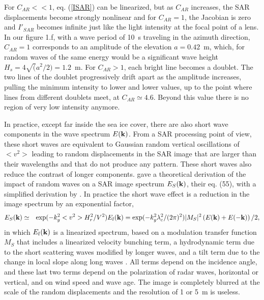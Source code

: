  For $C_{AR} << 1$, eq. (\ref{ISAR}) can be linearized, but as $C_{AR}$ increases, the SAR displacements become strongly nonlinear and for $C_{AR}= 1$, 
 the Jacobian is zero and $I'_{SAR}$ becomes infinite just like the light intensity at the focal point of a lens. 
In our figure 1.f, with a wave period of 10~s traveling in the azimuth direction, $C_{AR}= 1$  corresponds to an amplitude of the elevation $a=0.42$~m, 
which, for random waves of the same energy would be a significant wave height $H_s=4\sqrt(a^2/2)=1.2$~m. 
For $C_{AR} > 1$, each bright line becomes a doublet. The two lines of the doublet progressively drift apart as the amplitude increases, pulling 
the minimum intensity to lower and lower values, up to the point where lines 
from different doublets meet, at $ C_{AR} \simeq 4.6$. Beyond this value there is no region of very low intensity anymore. 

In practice, except far inside the  sea ice cover, there are also short wave components in the wave spectrum $E(\mathbf{k})$. From a SAR processing point of view, 
these short waves are equivalent to Gaussian random vertical oscillations 
of $<v^2>$ leading to random displacements in the SAR image that are larger than their wavelengths and that do not produce any pattern. These short 
waves also reduce the contrast of longer components. \cite{Hasselmann&Hasselmann1991} gave a theoretical derivation of the impact of random waves on a SAR image spectrum $E_S(\mathbf{k})$,
their eq. (55), with a simplified derivation by \cite{Krogstad1992}. In practice the short wave effect is a reduction in the image spectrum by an exponential factor,  
\begin{eqnarray}
 E_S(\mathbf{k})&\simeq& \exp(-k_y^2 <v^2> H_r^2/V^2) E_l (\mathbf{k}) = \exp(-k_y^2 \lambda_c^2/(2 \pi)^2 ) |M_S|^2 \left(E(\mathbf{k})+E(-\mathbf{k})\right)/2 , \label{eq:cutoff}
\end{eqnarray}
in which $E_l(\mathbf{k})$ is a linearized spectrum, based on a modulation transfer function $M_S$ that includes a linearized velocity bunching term, a hydrodynamic term due to the short scattering waves modified by 
longer waves, and a tilt term due to the change in local slope along long waves \citep{Hasselmann&al.1985,Hasselmann&Hasselmann1991}. All terms depend on the incidence angle, 
and these last two terms depend on the polarization of radar waves, horizontal or vertical, and on wind speed and wave age. 
The image is 
completely blurred at the scale of the random displacements and the resolution of 1 or 5~m is useless.


